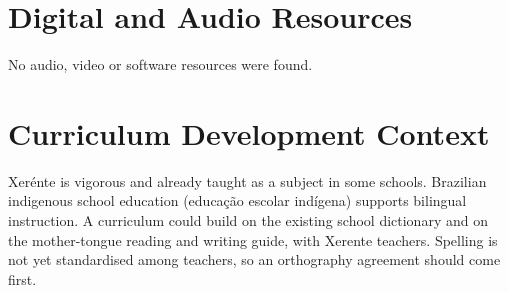 \documentclass[12pt]{article}
\begin{document}
\section{Digital and Audio Resources}
No audio, video or software resources were found.

\section{Curriculum Development Context}
Xer\'ente is vigorous and already taught as a subject in some schools. Brazilian indigenous school education (educa\c{c}\~ao escolar ind\'igena) supports bilingual instruction. A curriculum could build on the existing school dictionary and on the mother-tongue reading and writing guide, with Xerente teachers. Spelling is not yet standardised among teachers, so an orthography agreement should come first.
\end{document}
